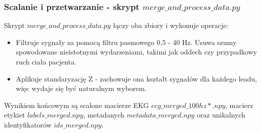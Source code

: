 \subsubsection*{Scalanie i przetwarzanie - skrypt $merge\_and\_process\_data.py$}
Skrypt $merge\_and\_process\_data.py$ łączy oba zbiory i wykonuje operacje:
\begin{itemize}
    \item Filtruje sygnały za pomocą filtru pasmowego 0,5 - 40 Hz. Usuwa szumy spowodowane nieistotnymi
    wydarzeniami, takimi jak oddech czy przypadkowy ruch ciała pacjenta.
    \item Aplikuje standaryzację Z - zachowuje ona kształt sygnałów dla każdego leadu,
    więc wydaje się być naturalnym wyborem.
\end{itemize}

Wynikiem końcowym są scalone macierze EKG
$ecg\_merged\_100hz*.npy$, macierz etykiet
$labels\_merged.npy$, metadanych $metadata\_merged.npy$ oraz
unikalnych identyfikatorów $ids\_merged.npy$.